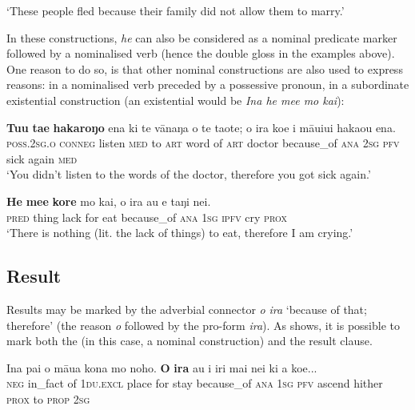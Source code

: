 \glt
‘These people fled because their family did not allow them to marry.’ \textstyleExampleref{[R303.144]} 
\z

In these constructions, \textit{he} can also be considered as a nominal predicate marker followed by a nominalised verb (hence the double gloss in the examples above). One reason to do so, is that other nominal constructions are also used to express reasons: in  a nominalised verb preceded by a possessive pronoun, in  a subordinate existential construction (an existential  would be \textit{{\ꞌ}Ina he me{\ꞌ}e mo kai}):

\ea\label{ex:11.258}
\gll \textbf{Tu{\ꞌ}u} \textbf{ta{\ꞌ}e} \textbf{hakaroŋo} ena ki te vānaŋa o te taote; {\ꞌ}o ira  koe i māuiui haka{\ꞌ}ou ena.\\
\textsc{poss.2sg.o} \textsc{conneg} listen \textsc{med} to \textsc{art} word of \textsc{art} doctor because\_of \textsc{ana}  \textsc{2sg} \textsc{pfv} sick again \textsc{med}\\

\glt 
‘You didn’t listen to the words of the doctor, therefore you got sick again.’ \textstyleExampleref{[R237.087]} 
\z

\ea\label{ex:11.259}
\gll \textbf{He} \textbf{me{\ꞌ}e} \textbf{kore} mo kai, {\ꞌ}o ira au e taŋi nei. \\
\textsc{pred} thing lack for eat because\_of \textsc{ana} \textsc{1sg} \textsc{ipfv} cry \textsc{prox} \\

\glt 
‘There is nothing (lit. the lack of things) to eat, therefore I am crying.’ \textstyleExampleref{[R349.013]} 
\z
{}

\subsection{Result}\label{sec:11.6.5}

Results may be marked by the adverbial connector \textit{{\ꞌ}o} \textit{ira} ‘because of that; therefore’ (the reason  \textit{{\ꞌ}o} followed by the pro-form \textit{ira}). As  shows, it is possible to mark both the  (in this case, a nominal construction) and the result clause.

\ea\label{ex:11.260}
\gll {\ꞌ}Ina pa{\ꞌ}i o māua kona mo noho. \textbf{{\ꞌ}O} \textbf{ira} au i iri mai nei  ki a koe...\\
\textsc{neg} in\_fact of \textsc{1du.excl} place for stay because\_of \textsc{ana} \textsc{1sg} \textsc{pfv} ascend hither \textsc{prox}  to \textsc{prop} \textsc{2sg}\\

